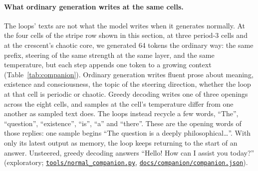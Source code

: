 \documentclass[11pt,letterpaper]{article}
\newcommand{\repourl}{https://github.com/tdj28/neural-shrimp}
\newcommand{\reporef}{arxiv-v1}
\newcommand{\repo}[1]{\href{\repourl/blob/\reporef/#1}{\nolinkurl{#1}}}
\begin{document}
\paragraph{What ordinary generation writes at the same cells.} The loops' texts are not what the model writes when it
generates normally. At the four cells of the stripe row shown in this section, at three period-3 cells and at the
crescent's chaotic core, we generated 64 tokens the ordinary way: the same prefix, steering of the same strength at the
same layer, and the same temperature, but each step appends one token to a growing context (Table~\ref{tab:companion}).
Ordinary generation writes fluent prose about meaning, existence and consciousness, the topic of the steering
direction, whether the loop at that cell is periodic or chaotic. Greedy decoding writes one of three openings across
the eight cells, and samples at the cell's temperature differ from one another as sampled text does. The loops instead
recycle a few words, ``The'', ``question'', ``existence'', ``is'', ``a'' and ``there''. These are the opening words of
those replies: one sample begins ``The question is a deeply philosophical\ldots''. With only its latest output as
memory, the loop keeps returning to the start of an answer. Unsteered, greedy decoding answers ``Hello! How can I
assist you today?'' (exploratory; \repo{tools/normal_companion.py}, \repo{docs/companion/companion.json}).
\end{document}

